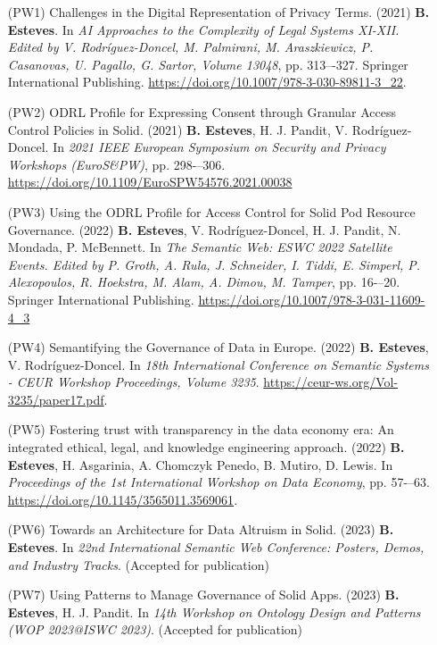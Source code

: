 \begin{enumerate}
    \item [(PW1)] Challenges in the Digital Representation of Privacy Terms. (2021) \textbf{B. Esteves}. In \textit{AI Approaches to the Complexity of Legal Systems XI-XII. Edited by V. Rodríguez-Doncel, M. Palmirani, M. Araszkiewicz, P. Casanovas, U. Pagallo, G. Sartor, Volume 13048}, pp. 313–-327. Springer International Publishing. \url{https://doi.org/10.1007/978-3-030-89811-3\_22}.
    \item [(PW2)] ODRL Profile for Expressing Consent through Granular Access Control Policies in Solid. (2021) \textbf{B. Esteves}, H. J. Pandit, V. Rodríguez-Doncel. In \textit{2021 IEEE European Symposium on Security and Privacy Workshops (EuroS\&PW)}, pp. 298-–306. \url{https://doi.org/10.1109/EuroSPW54576.2021.00038}
    \item [(PW3)] Using the ODRL Profile for Access Control for Solid Pod Resource Governance. (2022) \textbf{B. Esteves}, V. Rodríguez-Doncel, H. J. Pandit, N. Mondada, P. McBennett. In \textit{The Semantic Web: ESWC 2022 Satellite Events. Edited by P. Groth, A. Rula, J. Schneider, I. Tiddi, E. Simperl, P. Alexopoulos, R. Hoekstra, M. Alam, A. Dimou, M. Tamper}, pp. 16-–20. Springer International Publishing. \url{https://doi.org/10.1007/978-3-031-11609-4\_3}
    \item [(PW4)] Semantifying the Governance of Data in Europe. (2022) \textbf{B. Esteves}, V. Rodríguez-Doncel. In \textit{18th International Conference on Semantic Systems - CEUR Workshop Proceedings, Volume 3235}. \url{https://ceur-ws.org/Vol-3235/paper17.pdf}.
    \item [(PW5)] Fostering trust with transparency in the data economy era: An integrated ethical, legal, and knowledge engineering approach. (2022) \textbf{B. Esteves}, H. Asgarinia, A. Chomczyk Penedo, B. Mutiro, D. Lewis. In \textit{Proceedings of the 1st International Workshop on Data Economy}, pp. 57-–63. \url{https://doi.org/10.1145/3565011.3569061}.
    \item [(PW6)] Towards an Architecture for Data Altruism in Solid. (2023) \textbf{B. Esteves}. In \textit{22nd International Semantic Web Conference: Posters, Demos, and Industry Tracks}. (Accepted for publication)
    \item [(PW7)] Using Patterns to Manage Governance of Solid Apps. (2023) \textbf{B. Esteves}, H. J. Pandit. In \textit{14th Workshop on Ontology Design and Patterns (WOP 2023@ISWC 2023)}. (Accepted for publication)
\end{enumerate}

